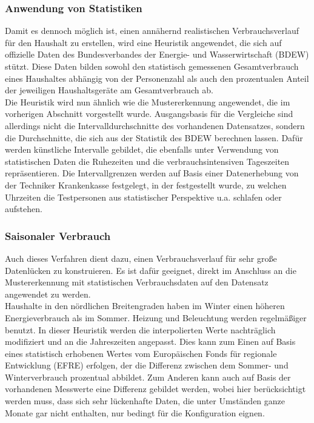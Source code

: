 \subsubsection{Anwendung von Statistiken}
Damit es dennoch möglich ist, einen annähernd realistischen Verbrauchsverlauf für den Haushalt zu erstellen, wird eine Heuristik angewendet, die sich auf offizielle Daten des Bundesverbandes der Energie- und Wasserwirtschaft (BDEW) stützt. Diese Daten bilden sowohl den statistisch gemessenen Gesamtverbrauch eines Haushaltes abhängig von der Personenzahl als auch den prozentualen Anteil der jeweiligen Haushaltsgeräte am Gesamtverbrauch ab.\\
Die Heuristik wird nun ähnlich wie die Mustererkennung angewendet, die im vorherigen Abschnitt vorgestellt wurde. Ausgangsbasis für die Vergleiche sind allerdings nicht die Intervalldurchschnitte des vorhandenen Datensatzes, sondern die Durchschnitte, die sich aus der Statistik des BDEW berechnen lassen. Dafür werden künstliche Intervalle gebildet, die ebenfalls unter Verwendung von statistischen Daten die Ruhezeiten und die verbrauchsintensiven Tageszeiten repräsentieren. Die Intervallgrenzen werden auf Basis einer Datenerhebung von der Techniker Krankenkasse festgelegt, in der festgestellt wurde, zu welchen Uhrzeiten die Testpersonen aus statistischer Perspektive u.a. schlafen oder aufstehen.

\subsubsection{Saisonaler Verbrauch}
Auch dieses Verfahren dient dazu, einen Verbrauchsverlauf für sehr große Datenlücken zu konstruieren. Es ist dafür geeignet, direkt im Anschluss an die Mustererkennung mit statistischen Verbrauchsdaten auf den Datensatz angewendet zu werden.\\
Haushalte in den nördlichen Breitengraden haben im Winter einen höheren Energieverbrauch als im Sommer. Heizung und Beleuchtung werden regelmäßiger benutzt. In dieser Heuristik werden die interpolierten Werte nachträglich modifiziert und an die Jahreszeiten angepasst. Dies kann zum Einen auf Basis eines statistisch erhobenen Wertes vom Europäischen Fonds für regionale Entwicklung (EFRE) erfolgen, der die Differenz zwischen dem Sommer- und Winterverbrauch prozentual abbildet. Zum Anderen kann auch auf Basis der vorhandenen Messwerte eine Differenz gebildet werden, wobei hier berücksichtigt werden muss, dass sich sehr lückenhafte Daten, die unter Umständen ganze Monate gar nicht enthalten, nur bedingt für die Konfiguration eignen. 
